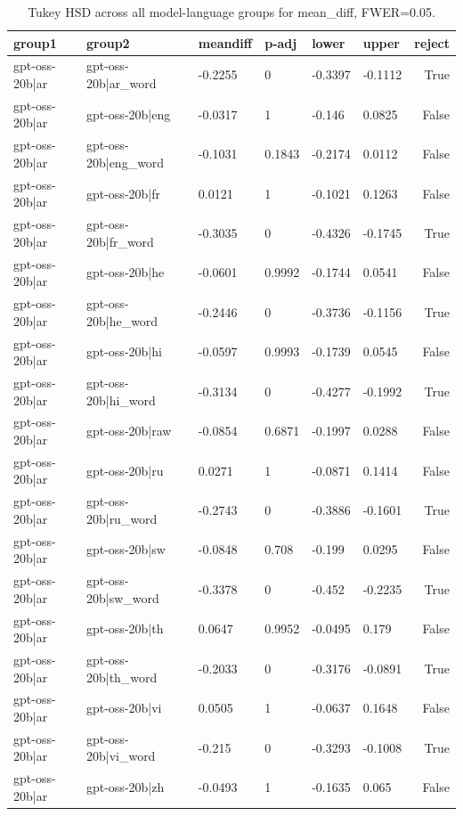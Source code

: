 \begin{table}
\caption{Tukey HSD across all model-language groups for mean_diff, FWER=0.05.}
\label{tab:tukey_all_models_all_langs_mean_diff}
\begin{tabular}{llllllr}
\toprule
group1 & group2 & meandiff & p-adj & lower & upper & reject \\
\midrule
gpt-oss-20b|ar & gpt-oss-20b|ar_word & -0.2255 & 0 & -0.3397 & -0.1112 & True \\
gpt-oss-20b|ar & gpt-oss-20b|eng & -0.0317 & 1 & -0.146 & 0.0825 & False \\
gpt-oss-20b|ar & gpt-oss-20b|eng_word & -0.1031 & 0.1843 & -0.2174 & 0.0112 & False \\
gpt-oss-20b|ar & gpt-oss-20b|fr & 0.0121 & 1 & -0.1021 & 0.1263 & False \\
gpt-oss-20b|ar & gpt-oss-20b|fr_word & -0.3035 & 0 & -0.4326 & -0.1745 & True \\
gpt-oss-20b|ar & gpt-oss-20b|he & -0.0601 & 0.9992 & -0.1744 & 0.0541 & False \\
gpt-oss-20b|ar & gpt-oss-20b|he_word & -0.2446 & 0 & -0.3736 & -0.1156 & True \\
gpt-oss-20b|ar & gpt-oss-20b|hi & -0.0597 & 0.9993 & -0.1739 & 0.0545 & False \\
gpt-oss-20b|ar & gpt-oss-20b|hi_word & -0.3134 & 0 & -0.4277 & -0.1992 & True \\
gpt-oss-20b|ar & gpt-oss-20b|raw & -0.0854 & 0.6871 & -0.1997 & 0.0288 & False \\
gpt-oss-20b|ar & gpt-oss-20b|ru & 0.0271 & 1 & -0.0871 & 0.1414 & False \\
gpt-oss-20b|ar & gpt-oss-20b|ru_word & -0.2743 & 0 & -0.3886 & -0.1601 & True \\
gpt-oss-20b|ar & gpt-oss-20b|sw & -0.0848 & 0.708 & -0.199 & 0.0295 & False \\
gpt-oss-20b|ar & gpt-oss-20b|sw_word & -0.3378 & 0 & -0.452 & -0.2235 & True \\
gpt-oss-20b|ar & gpt-oss-20b|th & 0.0647 & 0.9952 & -0.0495 & 0.179 & False \\
gpt-oss-20b|ar & gpt-oss-20b|th_word & -0.2033 & 0 & -0.3176 & -0.0891 & True \\
gpt-oss-20b|ar & gpt-oss-20b|vi & 0.0505 & 1 & -0.0637 & 0.1648 & False \\
gpt-oss-20b|ar & gpt-oss-20b|vi_word & -0.215 & 0 & -0.3293 & -0.1008 & True \\
gpt-oss-20b|ar & gpt-oss-20b|zh & -0.0493 & 1 & -0.1635 & 0.065 & False \\

\end{tabular}
\end{table}
